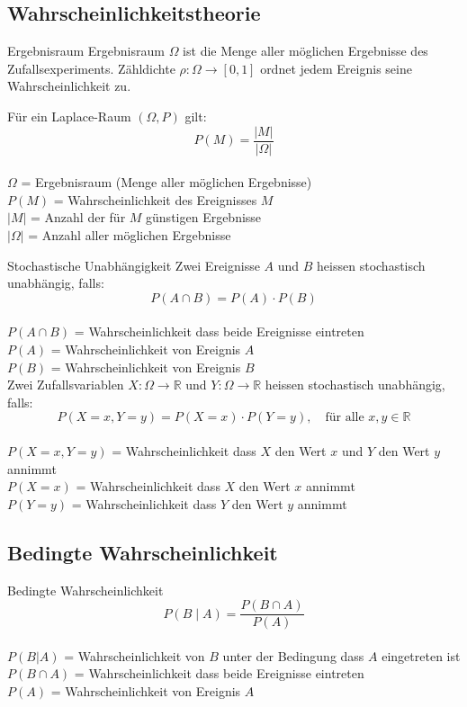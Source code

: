 \subsection{Wahrscheinlichkeitstheorie}
\begin{definition}{Ergebnisraum}
Ergebnisraum $\Omega$ ist die Menge aller möglichen Ergebnisse des Zufallsexperiments. Zähldichte $\rho: \Omega \rightarrow[0,1]$ ordnet jedem Ereignis seine Wahrscheinlichkeit zu.

Für ein Laplace-Raum $(\Omega, P)$ gilt:
$$
P(M)=\frac{|M|}{|\Omega|}
$$
\\
$\Omega$ = Ergebnisraum (Menge aller möglichen Ergebnisse)\\
$P(M)$ = Wahrscheinlichkeit des Ereignisses $M$\\
$|M|$ = Anzahl der für $M$ günstigen Ergebnisse\\
$|\Omega|$ = Anzahl aller möglichen Ergebnisse\\
\end{definition}

\begin{theorem}{Stochastische Unabhängigkeit}
Zwei Ereignisse $A$ und $B$ heissen stochastisch unabhängig, falls:
$$
P(A \cap B)=P(A) \cdot P(B)
$$
\\
$P(A \cap B)$ = Wahrscheinlichkeit dass beide Ereignisse eintreten\\
$P(A)$ = Wahrscheinlichkeit von Ereignis $A$\\
$P(B)$ = Wahrscheinlichkeit von Ereignis $B$\\

Zwei Zufallsvariablen $X: \Omega \rightarrow \mathbb{R}$ und $Y: \Omega \rightarrow \mathbb{R}$ heissen stochastisch unabhängig, falls:
$$
P(X=x, Y=y)=P(X=x) \cdot P(Y=y), \quad \text{für alle } x, y \in \mathbb{R}
$$
\\
$P(X=x, Y=y)$ = Wahrscheinlichkeit dass $X$ den Wert $x$ und $Y$ den Wert $y$ annimmt\\
$P(X=x)$ = Wahrscheinlichkeit dass $X$ den Wert $x$ annimmt\\
$P(Y=y)$ = Wahrscheinlichkeit dass $Y$ den Wert $y$ annimmt\\
\end{theorem}

\subsection{Bedingte Wahrscheinlichkeit}
\begin{definition}{Bedingte Wahrscheinlichkeit}
$$
P(B \mid A)=\frac{P(B \cap A)}{P(A)}
$$
\\
$P(B|A)$ = Wahrscheinlichkeit von $B$ unter der Bedingung dass $A$ eingetreten ist\\
$P(B \cap A)$ = Wahrscheinlichkeit dass beide Ereignisse eintreten\\
$P(A)$ = Wahrscheinlichkeit von Ereignis $A$\\
\end{definition}

